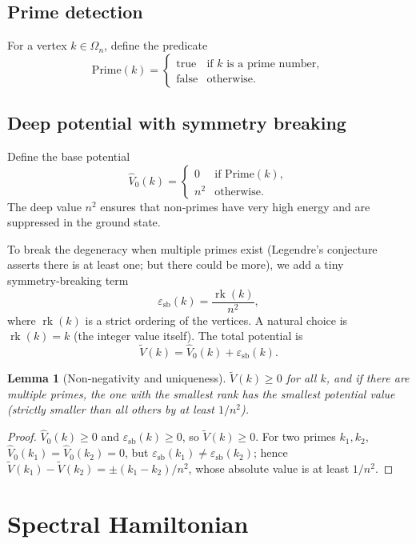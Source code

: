 \documentclass[11pt,a4paper]{article}
\newtheorem{lemma}[theorem]{Lemma}
\begin{document}
\subsection{Prime detection}
For a vertex $k\in\Omega_n$, define the predicate
\[
\text{Prime}(k) = 
\begin{cases}
\text{true} & \text{if } k \text{ is a prime number},\\
\text{false} & \text{otherwise}.
\end{cases}
\]

\subsection{Deep potential with symmetry breaking}
Define the base potential
\[
\hat{V}_0(k) = 
\begin{cases}
0 & \text{if } \text{Prime}(k),\\
n^2 & \text{otherwise}.
\end{cases}
\]
The deep value $n^2$ ensures that non‑primes have very high energy and are suppressed in the ground state.

To break the degeneracy when multiple primes exist (Legendre's conjecture asserts there is at least one; but there could be more), we add a tiny symmetry‑breaking term
\[
\varepsilon_{\text{sb}}(k) = \frac{\operatorname{rk}(k)}{n^2},
\]
where $\operatorname{rk}(k)$ is a strict ordering of the vertices. A natural choice is $\operatorname{rk}(k)=k$ (the integer value itself). The total potential is
\[
\tilde{V}(k) = \hat{V}_0(k) + \varepsilon_{\text{sb}}(k).
\]

\begin{lemma}[Non‑negativity and uniqueness]
$\tilde{V}(k) \ge 0$ for all $k$, and if there are multiple primes, the one with the smallest rank has the smallest potential value (strictly smaller than all others by at least $1/n^2$).
\end{lemma}
\begin{proof}
$\hat{V}_0(k)\ge0$ and $\varepsilon_{\text{sb}}(k)\ge0$, so $\tilde{V}(k)\ge0$. For two primes $k_1,k_2$, $\hat{V}_0(k_1)=\hat{V}_0(k_2)=0$, but $\varepsilon_{\text{sb}}(k_1)\neq\varepsilon_{\text{sb}}(k_2)$; hence $\tilde{V}(k_1)-\tilde{V}(k_2)=\pm (k_1-k_2)/n^2$, whose absolute value is at least $1/n^2$.
\end{proof}

\section{Spectral Hamiltonian}
\end{document}
